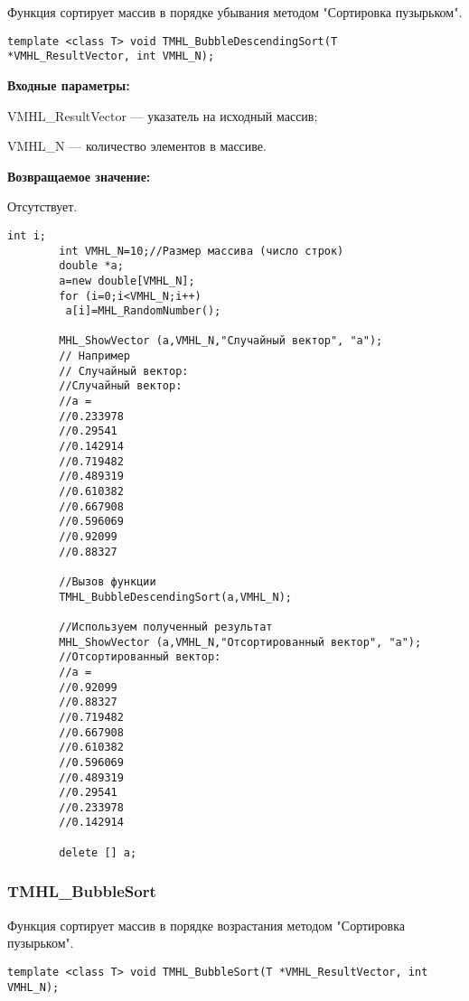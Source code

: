 \documentclass[a4paper,12pt]{article}
\begin{document}
Функция сортирует массив в порядке убывания методом "Сортировка пузырьком".


\begin{lstlisting}[label=code_syntax_TMHL_BubbleDescendingSort,caption=Синтаксис]
template <class T> void TMHL_BubbleDescendingSort(T *VMHL_ResultVector, int VMHL_N);
\end{lstlisting}

\textbf{Входные параметры:}
 
VMHL\_ResultVector --- указатель на исходный массив;
 
VMHL\_N --- количество элементов в массиве.

\textbf{Возвращаемое значение:}

Отсутствует.


\begin{lstlisting}[label=code_use_TMHL_BubbleDescendingSort,caption=Пример использования]
        int i;
        int VMHL_N=10;//Размер массива (число строк)
        double *a;
        a=new double[VMHL_N];
        for (i=0;i<VMHL_N;i++)
         a[i]=MHL_RandomNumber();

        MHL_ShowVector (a,VMHL_N,"Случайный вектор", "a");
        // Например
        // Случайный вектор:
        //Случайный вектор:
        //a =
        //0.233978
        //0.29541
        //0.142914
        //0.719482
        //0.489319
        //0.610382
        //0.667908
        //0.596069
        //0.92099
        //0.88327

        //Вызов функции
        TMHL_BubbleDescendingSort(a,VMHL_N);

        //Используем полученный результат
        MHL_ShowVector (a,VMHL_N,"Отсортированный вектор", "a");
        //Отсортированный вектор:
        //a =
        //0.92099
        //0.88327
        //0.719482
        //0.667908
        //0.610382
        //0.596069
        //0.489319
        //0.29541
        //0.233978
        //0.142914

        delete [] a;
\end{lstlisting}

\subsubsection{TMHL\_BubbleSort}\label{TMHL_BubbleSort}

Функция сортирует массив в порядке возрастания методом "Сортировка пузырьком".


\begin{lstlisting}[label=code_syntax_TMHL_BubbleSort,caption=Синтаксис]
template <class T> void TMHL_BubbleSort(T *VMHL_ResultVector, int VMHL_N);
\end{lstlisting}
\end{document}
